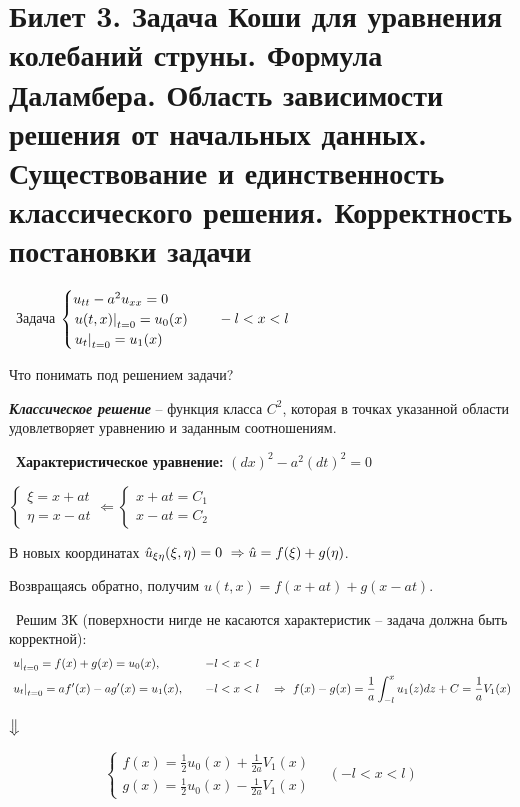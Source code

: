 \documentclass[../main.tex]{subfiles}
\begin{document}
  
\section{Билет 3. Задача Коши для уравнения колебаний струны. Формула Даламбера. Область зависимости решения от начальных данных. Существование и единственность классического решения. Корректность постановки задачи}
\textbullet\ Задача $\begin{cases} u_{tt}-a^2u_{xx} = 0\\ \left. u(t,x)\right|_{t=0} = u_0(x)\\ \left. u_t\right|_{t=0} = u_1(x)\end{cases}\quad -l<x<l$

Что понимать под решением задачи?

\begin{definition} \textbf{\emph{Классическое решение}} -- функция класса $C^2$, которая в точках указанной области удовлетворяет уравнению и заданным соотношениям.
\end{definition}

\textbullet\ {\bf Характеристическое уравнение: } $(dx)^2 - a^2(dt)^2 = 0$

$\begin{cases} \xi = x+at \\ \eta = x-at \end{cases} \Leftarrow \begin{cases} x+at = C_1 \\ x-at = C_2 \end{cases}$

В новых координатах $\hat{u}_{\xi\eta}(\xi,\eta) = 0\ \Rightarrow \hat{u} = f(\xi) + g(\eta) $.

Возвращаясь обратно, получим $u(t,x) = f(x+at) + g(x-at)$.
\vspace{0.4em}

\textbullet\ Решим ЗК (поверхности нигде не касаются характеристик -- задача должна быть корректной):
\begin{equation*}
\begin{aligned}
&\left. u\right|_{t=0} = f(x) + g(x) = u_0(x), \quad &-l < x< l&\\
&\left. u_t\right|_{t=0} =  af'(x) - ag'(x) = u_1(x), \quad &-l < x < l& \quad \Rightarrow\ f(x) - g(x) = \frac1{a}\int _{-l}^xu_1(z)dz + C = \frac1{a}V_1(x)
\end{aligned}
\end{equation*}
\begin{center}
$\big\Downarrow$
\end{center}
\begin{equation}
\label{eq::3::dalam}
\tag{*}
\begin{cases} f(x) = \frac1{2}u_0(x) + \frac1{2a}V_1(x) \\ g(x) = \frac1{2}u_0(x) - \frac1{2a}V_1(x) \end{cases} \quad (-l < x< l)
\end{equation}
\end{document}
